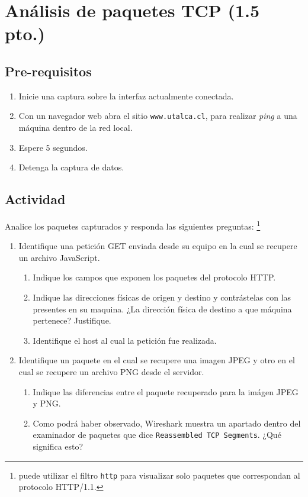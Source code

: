 \documentclass[11pt]{utalcaDoc}
\begin{document}
\section{Análisis de paquetes TCP (1.5 pto.)}
\subsection{Pre-requisitos}
\begin{enumerate}
    \item{ Inicie una captura sobre la interfaz actualmente conectada. }
    \item{ Con un navegador web abra el sitio \texttt{www.utalca.cl},
    para realizar \emph{ping} a una máquina dentro de la red local. }
    \item{ Espere 5 segundos. }
    \item{ Detenga la captura de datos. }
\end{enumerate}
\subsection{Actividad}
Analice los paquetes capturados y responda las siguientes preguntas: 
\footnote{puede utilizar el filtro \texttt{http} para visualizar solo paquetes que 
correspondan al protocolo HTTP/1.1.}
\begin{enumerate}
    \item{ Identifique una petición GET enviada desde su equipo en la cual se recupere un archivo JavaScript.
        \begin{enumerate}
            \item { Indique los campos que exponen los paquetes del protocolo HTTP.}
            \item { Indique las direcciones físicas de origen y destino y contrástelas con 
            las presentes en su maquina. ¿La dirección física de destino a que máquina pertenece?
            Justifique.}
            \item { Identifique el host al cual la petición fue realizada. }
        \end{enumerate}
    }
    \item{ Identifique un paquete en el cual se recupere una imagen JPEG y otro en el cual
    se recupere un archivo PNG desde el servidor.
        \begin{enumerate}
            \item { Indique las diferencias entre el paquete recuperado para la imágen JPEG y PNG.}
            \item { Como podrá haber observado, Wireshark muestra un apartado dentro del 
            examinador de paquetes que dice \texttt{Reassembled TCP Segments}. ¿Qué significa esto?}
        \end{enumerate}
    }
\end{enumerate}
\end{document}
